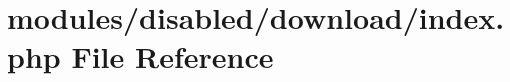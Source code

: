 \hypertarget{disabled_2download_2index_8php}{\section{modules/disabled/download/index.php File Reference}
\label{disabled_2download_2index_8php}
}

